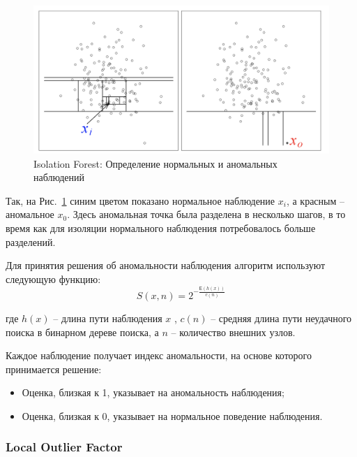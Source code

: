 \documentclass[12pt]{article}
\begin{document}
    \begin{figure}[h!]
        \centering
        \includegraphics[width=0.8\linewidth]{IsolationForest.png}
        \caption{Isolation Forest: Определение нормальных и аномальных наблюдений}
        \label{sec:Research:Model:IsolationForest:fig:IsolationForest}
    \end{figure}

    \par Так, на Рис.~\ref{sec:Research:Model:IsolationForest:fig:IsolationForest} синим цветом показано нормальное наблюдение $x_i$, а красным -- аномальное $x_0$. Здесь аномальная точка была разделена в несколько шагов, в то время как для изоляции нормального наблюдения потребовалось больше разделений.

    \par Для принятия решения об аномальности наблюдения алгоритм используют следующую функцию:
    \begin{equation}
    \label{sec:Research:Model:IsolationForest:formula:IF}
        S(x,n) = 2^{-\frac{\mathsf{E}(h(x))}{c(n)}}
    \end{equation}

    \noindent где $h(x)$ -- длина пути наблюдения $x$ , $c(n)$ -- средняя длина пути неудачного поиска в бинарном дереве поиска, а $n$ -- количество внешних узлов.

    \par Каждое наблюдение получает индекс аномальности, на основе которого принимается решение:
    \begin{itemize}
        \item Оценка, близкая к 1, указывает на аномальность наблюдения;
        \item Оценка, близкая к 0, указывает на нормальное поведение наблюдения.
    \end{itemize}


    \subsubsection{Local Outlier Factor}
    \label{sec:Research:Model:LocalOutlierFactor}
\end{document}
